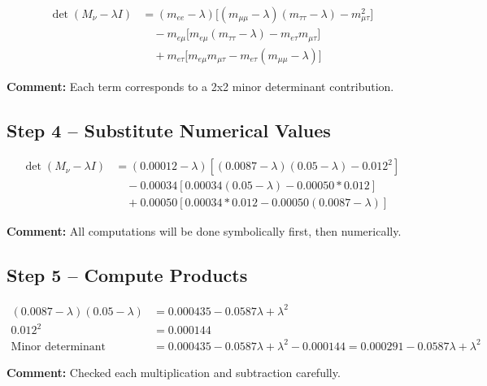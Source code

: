 \documentclass[12pt,a4paper]{article}
\begin{document}
\begin{align}
	\det(M_\nu - \lambda I) &= (m_{ee}-\lambda) \big[ (m_{\mu\mu}-\lambda)(m_{\tau\tau}-\lambda) - m_{\mu\tau}^2 \big] \\
	&\quad - m_{e\mu} \big[ m_{e\mu} (m_{\tau\tau}-\lambda) - m_{e\tau} m_{\mu\tau} \big] \\
	&\quad + m_{e\tau} \big[ m_{e\mu} m_{\mu\tau} - m_{e\tau} (m_{\mu\mu}-\lambda) \big]
\end{align}

\textbf{Comment:} Each term corresponds to a 2x2 minor determinant contribution.

\subsection{Step 4 – Substitute Numerical Values}

\begin{align}
	\det(M_\nu - \lambda I) &= (0.00012-\lambda)[(0.0087-\lambda)(0.05-\lambda) - 0.012^2] \\
	&\quad - 0.00034 [0.00034 (0.05-\lambda) - 0.00050*0.012] \\
	&\quad + 0.00050 [0.00034*0.012 - 0.00050(0.0087-\lambda)]
\end{align}

\textbf{Comment:} All computations will be done symbolically first, then numerically.

\subsection{Step 5 – Compute Products}

\begin{align}
	(0.0087-\lambda)(0.05-\lambda) &= 0.000435 - 0.0587 \lambda + \lambda^2 \\
	0.012^2 &= 0.000144 \\
	\text{Minor determinant} &= 0.000435 - 0.0587 \lambda + \lambda^2 - 0.000144 = 0.000291 - 0.0587 \lambda + \lambda^2
\end{align}

\textbf{Comment:} Checked each multiplication and subtraction carefully.

\end{document}
